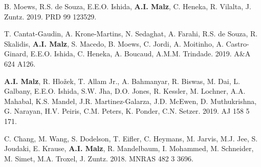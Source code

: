 \begin{list}{\pubnumber{\therefpubnum}}{\malzlist}
\item B. Moews, R.S. de Souza, E.E.O. Ishida, {\bf A.I. Malz}, C. Heneka, R. Vilalta, J. Zuntz. 2019. PRD 99 123529. 

\item T. Cantat-Gaudin, A. Krone-Martins, N. Sedaghat, A. Farahi, R.S. de Souza, R. Skalidis, {\bf A.I. Malz}, S. Macedo, B. Moews, C. Jordi, A. Moitinho, A. Castro-Ginard, E.E.O. Ishida, C. Heneka, A. Boucaud, A.M.M. Trindade. 2019. A\&A 624 A126. 

\item {\bf A.I. Malz}, R. Hlo{\v z}ek, %
T. Allam Jr., A. Bahmanyar, R. Biswas, M. Dai, L. Galbany, E.E.O. Ishida, S.W. Jha, D.O. Jones, R. Kessler, M. Lochner, A.A. Mahabal, K.S. Mandel, J.R. Martinez-Galarza, J.D. McEwen, D. Muthukrishna, G. Narayan, H.V. Peiris, C.M. Peters, K. Ponder, C.N. Setzer. 
2019. AJ 158 5 171. 


\item C. Chang, M. Wang, S. Dodelson, T. Eifler, C. Heymans, M. Jarvis, M.J. Jee, S. Joudaki, E. Krause, {\bf A.I. Malz}, R. Mandelbaum, I. Mohammed, M. Schneider, M. Simet, M.A. Troxel, J. Zuntz. 2018. MNRAS 482 3 3696. 


\end{list}
